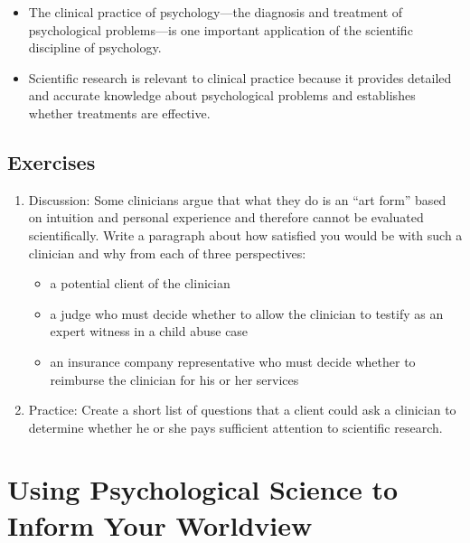 \documentclass[]{book}
\theoremstyle{definition}
\theoremstyle{definition}
\theoremstyle{remark}
\begin{document}
\begin{itemize}
\item
  The clinical practice of psychology---the diagnosis and treatment of
  psychological problems---is one important application of the
  scientific discipline of psychology.
\item
  Scientific research is relevant to clinical practice because it
  provides detailed and accurate knowledge about psychological problems
  and establishes whether treatments are effective.
\end{itemize}

\subsection{Exercises}\label{exercises-3}

\begin{enumerate}
\def\labelenumi{\arabic{enumi}.}
\item
  Discussion: Some clinicians argue that what they do is an ``art form''
  based on intuition and personal experience and therefore cannot be
  evaluated scientifically. Write a paragraph about how satisfied you
  would be with such a clinician and why from each of three
  perspectives:

  \begin{itemize}
  \item
    a potential client of the clinician
  \item
    a judge who must decide whether to allow the clinician to testify as
    an expert witness in a child abuse case
  \item
    an insurance company representative who must decide whether to
    reimburse the clinician for his or her services
  \end{itemize}
\item
  Practice: Create a short list of questions that a client could ask a
  clinician to determine whether he or she pays sufficient attention to
  scientific research.
\end{enumerate}

\section{Using Psychological Science to Inform Your
Worldview}\label{using-psychological-science-to-inform-your-worldview}
\end{document}
